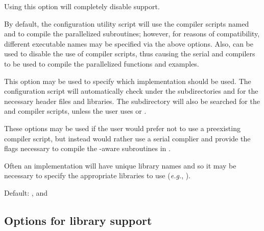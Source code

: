 \begin{config}
  
\item {}

  Using this option will completely disable {\mpi} support.

\item {}
\item {}

  By default, the configuration utility script will use the {\mpi} compiler
  scripts named  and  to compile the parallelized
  {\sundials} subroutines; however, for reasons of compatibility, different
  executable names may be specified via the above options. Also, 
  can be used to disable the use of {\mpi} compiler scripts, thus causing
  the serial {\C} and {\F} compilers to be used to compile the parallelized
  {\sundials} functions and examples.

\item {}

  This option may be used to specify which {\mpi} implementation should be used.
  The {\sundials} configuration script will automatically check under the
  subdirectories  and  for the necessary
  header files and libraries. The subdirectory  will also be
  searched for the {\C} and {\F} {\mpi} compiler scripts, unless the user uses
   or .

\item {}
\item {}
\item {}

  These options may be used if the user would prefer not to use a preexisting
  {\mpi} compiler script, but instead would rather use a serial complier and
  provide the flags necessary to compile the {\mpi}-aware subroutines in
  {\sundials}.

  Often an {\mpi} implementation will have unique library names and so it may
  be necessary to specify the appropriate libraries to use ({\em e.g.},
  ).

  Default: ,  and 

\end{config}


\subsection*{Options for library support}

